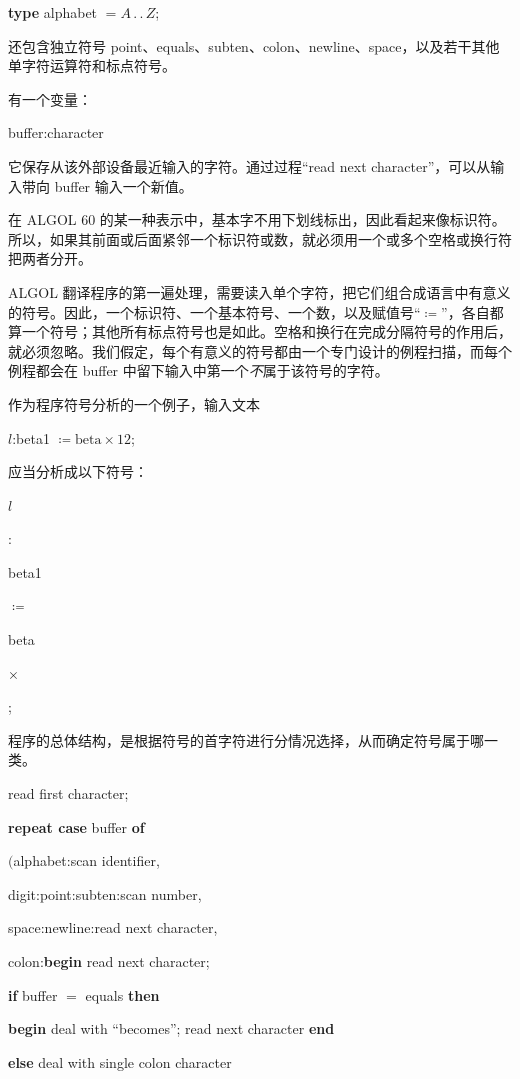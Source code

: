 \documentclass[twoside,11pt,fontset=none]{ctexbook}
\begin{document}
\quad \textbf{type} alphabet $= A\,.\,.\,Z$;

\noindent
还包含独立符号 point、equals、subten、colon、newline、space，以及若干其他单字符运算符和标点符号。

有一个变量：

\quad buffer:character 

\noindent
它保存从该外部设备最近输入的字符。通过过程“read next character”，可以从输入带向 buffer 输入一个新值。

在 ALGOL 60 的某一种表示中，基本字不用下划线标出，因此看起来像标识符。所以，如果其前面或后面紧邻一个标识符或数，就必须用一个或多个空格或换行符把两者分开。

ALGOL 翻译程序的第一遍处理，需要读入单个字符，把它们组合成语言中有意义的符号。因此，一个标识符、一个基本符号、一个数，以及赋值号“$\coloneq$”，各自都算一个符号；其他所有标点符号也是如此。空格和换行在完成分隔符号的作用后，就必须忽略。我们假定，每个有意义的符号都由一个专门设计的例程扫描，而每个例程都会在 buffer 中留下输入中第一个\textit{不}属于该符号的字符。

作为程序符号分析的一个例子，输入文本

\quad $l$:beta1 $\coloneq \text{beta} \times 12$;

\noindent
应当分析成以下符号：

\quad $l$

\quad :

\quad beta1

\quad $\coloneq$

\quad beta

\quad $\times$


\quad ;

程序的总体结构，是根据符号的首字符进行分情况选择，从而确定符号属于哪一类。

read first character;

\textbf{repeat case} buffer \textbf{of}

\quad $($alphabet:scan identifier,

\quad digit:point:subten:scan number,

\quad space:newline:read next character,

\quad colon:\textbf{begin} read next character;

\quad\quad \textbf{if} buffer $=$ equals \textbf{then}

\quad\quad\quad \textbf{begin} deal with ``becomes''; read next character \textbf{end}

\quad\quad \textbf{else} deal with single colon character
\end{document}
